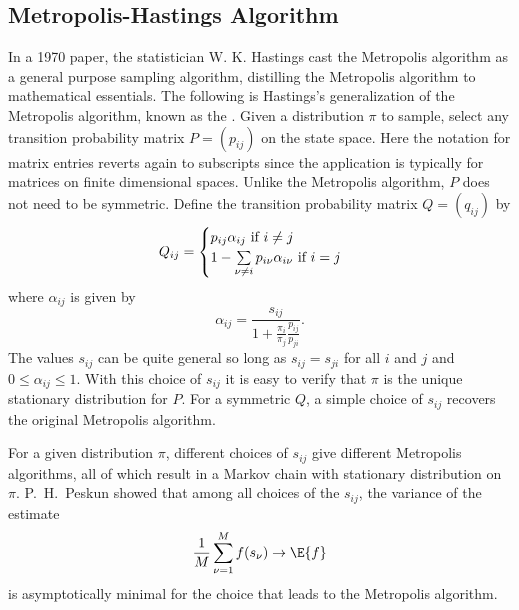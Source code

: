 \documentclass[12pt]{article}
\begin{document}
\subsection*{Metropolis-Hastings Algorithm}

In a 1970 paper, the statistician W. K. Hastings cast the Metropolis
algorithm as a general purpose sampling algorithm, distilling the
Metropolis algorithm to mathematical essentials.  The following is
Hastings's generalization of the Metropolis algorithm, known as the
.%
Given a distribution \( \pi \) to sample, select any transition
probability matrix \( P = (p_{ij}) \) on the state space.  Here the
notation for matrix entries reverts again to subscripts since the
application is typically for matrices on finite dimensional spaces.
Unlike the Metropolis algorithm, \( P \) does not need to be symmetric.
Define the transition probability matrix \( Q= (q_{ij}) \) by
\[
    Q_{ij} =
    \begin{cases}
        p_{ij} \alpha_{ij} \text{ if \( i \ne j \) } \\
        1 - \sum\limits_{\nu \ne i} p_{i\nu} \alpha_{i \nu} \text{ if \(
        i = j \) }
    \end{cases}
\] where \( \alpha_{ij} \) is given by
\[
    \alpha_{ij} = \frac{s_{ij}}{1 + \frac{\pi_i}{\pi_j} \frac{p_{ij}}{p_
    {ji}}}.
\] The values \( s_{ij} \) can be quite general so long as \( s_{ij} = s_
{ji} \) for all \( i \) and \( j \) and \( 0 \le \alpha_{ij} \le 1 \).
With this choice of \( s_{ij} \) it is easy to verify that \( \pi \) is
the unique stationary distribution for \( P \).  For a symmetric \( Q \),
a simple choice of \( s_{ij} \) recovers the original Metropolis
algorithm.

For a given distribution \( \pi \), different choices of \( s_{ij} \)
give different Metropolis algorithms, all of which result in a Markov
chain with stationary distribution on \( \pi \).  P.\ H.\ Peskun showed
that among all choices of the \( s_{ij} \), the variance of the estimate
\[
    \frac{1}{M} \sum\limits_{\nu=1}^M f(s_\nu) \to \E{f}
\] is asymptotically minimal for the choice that leads to the Metropolis
algorithm.
\end{document}
